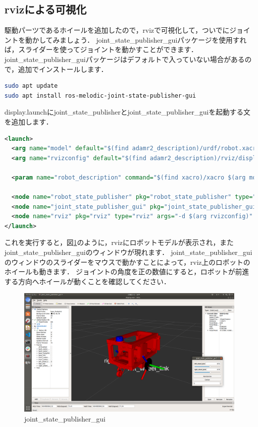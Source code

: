 \documentclass[{../../master}]{subfiles}
\begin{document}
\subsection{\textsf{rviz}による可視化}

駆動パーツであるホイールを追加したので，\textsf{rviz}で可視化して，ついでにジョイントを動かしてみましょう．
\textsf{joint\_state\_publisher\_gui}パッケージを使用すれば，スライダーを使ってジョイントを動かすことができます．
\textsf{joint\_state\_publisher\_gui}パッケージはデフォルトで入っていない場合があるので，追加でインストールします．

\begin{lstlisting}[language=sh, caption=Install \textsf{joint\_state\_publisher\_gui}]
sudo apt update
sudo apt install ros-melodic-joint-state-publisher-gui
\end{lstlisting}

\textsf{display.launch}に\textsf{joint\_state\_publisher}と\textsf{joint\_state\_publisher\_gui}を起動する文を追加します．

\begin{lstlisting}[language=XML, label=code:display_launch_add_joint_state_publisher_gui, caption=\textsf{display.launch}]
<launch>
  <arg name="model" default="$(find adamr2_description)/urdf/robot.xacro"/>
  <arg name="rvizconfig" default="$(find adamr2_description)/rviz/display.rviz" />

  <param name="robot_description" command="$(find xacro)/xacro $(arg model)" />

  <node name="robot_state_publisher" pkg="robot_state_publisher" type="robot_state_publisher"/>
  <node name="joint_state_publisher_gui" pkg="joint_state_publisher_gui" type="joint_state_publisher_gui"/>
  <node name="rviz" pkg="rviz" type="rviz" args="-d $(arg rvizconfig)" required="true"/>
</launch>
\end{lstlisting}

これを実行すると，図\ref{fig:rviz_joint_state_publisher_gui}のように，\textsf{rviz}にロボットモデルが表示され，また\textsf{joint\_state\_publisher\_gui}のウィンドウが現れます．
\textsf{joint\_state\_publisher\_gui}のウィンドウのスライダーをマウスで動かすことによって，\textsf{rviz}上のロボットのホイールも動きます．
ジョイントの角度を正の数値にすると，ロボットが前進する方向へホイールが動くことを確認してください．

\begin{figure}[ht]
  \centering
  \includegraphics[width=120truemm]{images/rviz_joint_state_publisher_gui.png}
  \caption{\textsf{joint\_state\_publisher\_gui}}
  \label{fig:rviz_joint_state_publisher_gui}
\end{figure}
\end{document}
